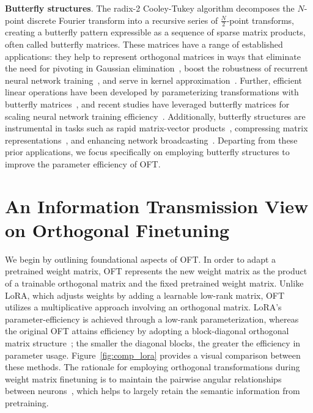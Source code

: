 \textbf{Butterfly structures}. The radix-2 Cooley-Tukey algorithm decomposes the $N$-point discrete Fourier transform into a recursive series of $\frac{N}{2}$-point transforms, creating a butterfly pattern expressible as a sequence of sparse matrix products, often called butterfly matrices. These matrices have a range of established applications: they help to represent orthogonal matrices in ways that eliminate the need for pivoting in Gaussian elimination~\cite{parker1995random}, boost the robustness of recurrent neural network training~\cite{jing2017tunable}, and serve in kernel approximation~\cite{munkhoeva2018quadrature}. Further, efficient linear operations have been developed by parameterizing transformations with butterfly matrices~\cite{dao2019learning,dao2019kaleidoscope}, and recent studies have leveraged butterfly matrices for scaling neural network training efficiency~\cite{chen2022pixelated,dao2022monarch}. Additionally, butterfly structures are instrumental in tasks such as rapid matrix-vector products~\cite{michielssen1996multilevel,o2010algorithm}, compressing matrix representations~\cite{li2015butterfly}, and enhancing network broadcasting~\cite{klasing1994broadcasting,li2003linear,rajasingh2016transmission}. Departing from these prior applications, we focus specifically on employing butterfly structures to improve the parameter efficiency of OFT.

\section{An Information Transmission View on Orthogonal Finetuning}

We begin by outlining foundational aspects of OFT. In order to adapt a pretrained weight matrix, OFT represents the new weight matrix as the product of a trainable orthogonal matrix and the fixed pretrained weight matrix. Unlike LoRA, which adjusts weights by adding a learnable low-rank matrix, OFT utilizes a multiplicative approach involving an orthogonal matrix. LoRA's parameter-efficiency is achieved through a low-rank parameterization, whereas the original OFT attains efficiency by adopting a block-diagonal orthogonal matrix structure~\cite{qiu2023controlling}; the smaller the diagonal blocks, the greater the efficiency in parameter usage. Figure~\ref{fig:comp_lora} provides a visual comparison between these methods. The rationale for employing orthogonal transformations during weight matrix finetuning is to maintain the pairwise angular relationships between neurons~\cite{liu2018learning,liu2021orthogonal,qiu2023controlling}, which helps to largely retain the semantic information from pretraining.

